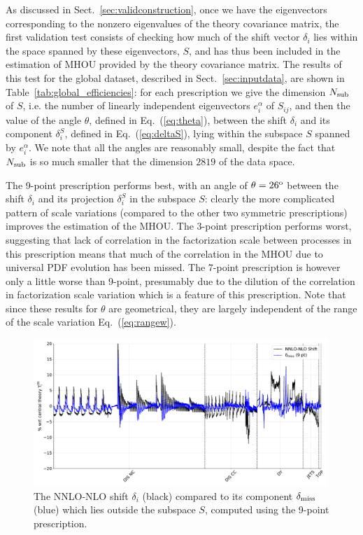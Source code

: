 As discussed in Sect.~\ref{sec:validconstruction}, once we have the eigenvectors corresponding to the nonzero eigenvalues of the theory covariance matrix, 
the first validation test consists of checking how much of the shift vector 
$\delta_i$ lies within the space spanned by these eigenvectors, $S$, and has thus been included in the estimation of MHOU provided by the theory 
covariance matrix.
%
The results of this test for the global dataset, described in Sect.~\ref{sec:inputdata}, are shown in  
Table~\ref{tab:global_efficiencies}: for each prescription we
give the dimension $N_{\rm sub}$
of $S$, i.e. the number of linearly independent eigenvectors
$e_i^\alpha$ of $S_{ij}$, and then the value of the angle $\theta$,
defined in Eq.~(\ref{eq:theta}),
between the shift $\delta_i$  and its component $\delta^S_i$, defined in Eq.~(\ref{eq:deltaS}), lying within 
the subspace $S$ spanned by $e_i^\alpha$. 
%
We note that all the angles are reasonably small, despite
the fact that $N_{\rm sub}$ is so much smaller that the dimension
$2819$ of the data space. 

The 9-point prescription performs best, with an angle of $\theta=26^{\rm o}$ between the shift $\delta_i$ and its projection $\delta_i^S$ in the subspace $S$: clearly the more complicated pattern of scale variations (compared to the other two symmetric prescriptions) improves the estimation of the MHOU.
%
The 3-point prescription performs worst, suggesting that lack of
correlation in the factorization scale between processes in this prescription 
means that much of the correlation in the MHOU due to universal PDF evolution has been missed.
%
The 7-point prescription is however only a little worse than 9-point, presumably due to the dilution of the correlation in factorization scale variation which is a feature of this prescription. Note that since these results for $\theta$ are geometrical, they are largely independent of the range of the scale variation Eq.~(\ref{eq:rangew}).

\begin{figure}[ht!]
  \begin{center}
    \includegraphics[width=0.99\textwidth]{mhous/plots/deltamiss_plot.pdf}
    \caption{The NNLO-NLO shift $\delta_i$ (black) compared to its 
component $\delta_{\rm miss}$ (blue) which lies outside the subspace $S$, computed using the 9-point prescription.}
    \label{fig:deltamiss}
  \end{center}
\end{figure}


